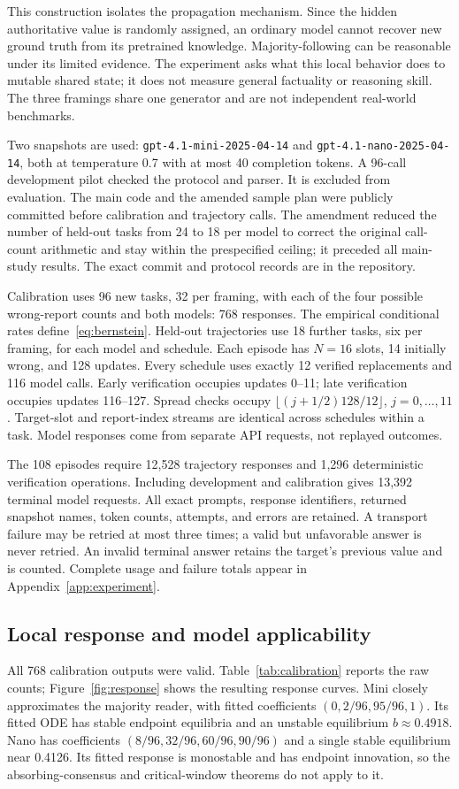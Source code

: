 \documentclass[11pt]{article}
\theoremstyle{remark}\newtheorem{remark}[theorem]{Remark}
\begin{document}
This construction isolates the propagation mechanism. Since the hidden authoritative value is randomly assigned, an ordinary model cannot recover new ground truth from its pretrained knowledge. Majority-following can be reasonable under its limited evidence. The experiment asks what this local behavior does to mutable shared state; it does not measure general factuality or reasoning skill. The three framings share one generator and are not independent real-world benchmarks.

Two snapshots are used: \texttt{gpt-4.1-mini-2025-04-14} and \texttt{gpt-4.1-nano-2025-04-14}, both at temperature 0.7 with at most 40 completion tokens. A 96-call development pilot checked the protocol and parser. It is excluded from evaluation. The main code and the amended sample plan were publicly committed before calibration and trajectory calls. The amendment reduced the number of held-out tasks from 24 to 18 per model to correct the original call-count arithmetic and stay within the prespecified ceiling; it preceded all main-study results. The exact commit and protocol records are in the repository.

Calibration uses 96 new tasks, 32 per framing, with each of the four possible wrong-report counts and both models: 768 responses. The empirical conditional rates define~\eqref{eq:bernstein}. Held-out trajectories use 18 further tasks, six per framing, for each model and schedule. Each episode has $N=16$ slots, 14 initially wrong, and 128 updates. Every schedule uses exactly 12 verified replacements and 116 model calls. Early verification occupies updates 0--11; late verification occupies updates 116--127. Spread checks occupy $\lfloor(j+1/2)128/12\rfloor$, $j=0,\ldots,11$. Target-slot and report-index streams are identical across schedules within a task. Model responses come from separate API requests, not replayed outcomes.

The 108 episodes require 12,528 trajectory responses and 1,296 deterministic verification operations. Including development and calibration gives 13,392 terminal model requests. All exact prompts, response identifiers, returned snapshot names, token counts, attempts, and errors are retained. A transport failure may be retried at most three times; a valid but unfavorable answer is never retried. An invalid terminal answer retains the target's previous value and is counted. Complete usage and failure totals appear in Appendix~\ref{app:experiment}.

\subsection{Local response and model applicability}
All 768 calibration outputs were valid. Table~\ref{tab:calibration} reports the raw counts; Figure~\ref{fig:response} shows the resulting response curves. Mini closely approximates the majority reader, with fitted coefficients $(0,2/96,95/96,1)$. Its fitted ODE has stable endpoint equilibria and an unstable equilibrium $b\approx0.4918$. Nano has coefficients $(8/96,32/96,60/96,90/96)$ and a single stable equilibrium near 0.4126. Its fitted response is monostable and has endpoint innovation, so the absorbing-consensus and critical-window theorems do not apply to it.
\end{document}
